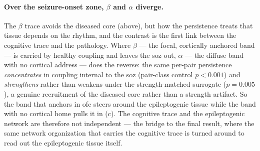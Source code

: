 \paragraph{Over the seizure-onset zone, \(\beta\) and \(\alpha\) diverge.}
The \(\beta\) trace avoids the diseased core (above), but how the persistence treats that tissue depends on the rhythm, and the contrast is the first link between the cognitive trace and the pathology. Where \(\beta\) --- the focal, cortically anchored band --- is carried by healthy coupling and leaves the \gls{soz} out, \(\alpha\) --- the diffuse band with no cortical address --- does the reverse: the same per-pair persistence \emph{concentrates} in coupling internal to the \gls{soz} (pair-class control \(p < 0.001\)) and \emph{strengthens} rather than weakens under the strength-matched surrogate (\(p = 0.005\)), a genuine recruitment of the diseased core rather than a strength artifact. So the band that anchors in \gls{ofc} steers around the epileptogenic tissue while the band with no cortical home pulls it in (c). The cognitive trace and the epileptogenic network are therefore not independent --- the bridge to the final result, where the same network organization that carries the cognitive trace is turned around to read out the epileptogenic tissue itself.
